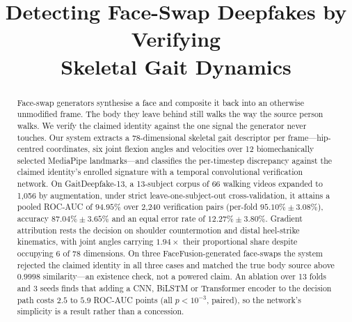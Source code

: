 \documentclass[conference]{IEEEtran}
\newif\ifismanon
\begin{document}
\title{Detecting Face-Swap Deepfakes by Verifying\\Skeletal Gait Dynamics}

\ifismanon
  \author{\IEEEauthorblockN{Anonymous Submission}
          \IEEEauthorblockA{Paper ID: XXXX}}
\else
  \author{
  }
\fi

\maketitle

\begin{abstract}
Face-swap generators synthesise a face and composite it back into an otherwise
unmodified frame. The body they leave behind still walks the way the source
person walks. We verify the claimed identity against the one signal the
generator never touches. Our system extracts a 78-dimensional skeletal gait descriptor
per frame---hip-centred coordinates, six joint flexion angles and velocities
over 12 biomechanically selected MediaPipe landmarks---and classifies the
per-timestep discrepancy against the claimed identity's enrolled signature with
a temporal convolutional verification network. On GaitDeepfake-13, a
13-subject corpus of 66 walking videos expanded to 1{,}056 by augmentation,
under strict leave-one-subject-out cross-validation, it attains a pooled
ROC-AUC of $94.95\%$ over 2{,}240 verification pairs (per-fold
$95.10\% \pm 3.08\%$), accuracy $87.04\% \pm 3.65\%$ and an equal error rate of
$12.27\% \pm 3.80\%$. Gradient attribution rests the decision on shoulder
countermotion and distal heel-strike kinematics, with joint angles carrying
$1.94\times$ their proportional share despite occupying 6 of 78 dimensions. On
three FaceFusion-generated face-swaps the system rejected the claimed identity
in all three cases and matched the true body source above $0.9998$
similarity---an existence check, not a powered claim. An ablation over 13 folds
and 3 seeds finds that adding a CNN, BiLSTM or Transformer encoder to the
decision path costs $2.5$ to $5.9$ ROC-AUC points (all $p < 10^{-3}$, paired),
so the network's simplicity is a result rather than a concession.
\end{abstract}
\end{document}
